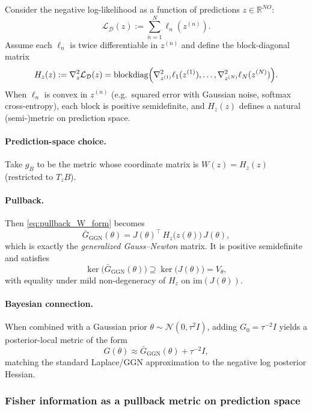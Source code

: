 Consider the negative log-likelihood as a function of predictions $z\in\mathbb R^{NO}$:
\[
\mathcal L_{\mathcal D}(z) := \sum_{n=1}^N \ell_n(z^{(n)}).
\]
Assume each $\ell_n$ is twice differentiable in $z^{(n)}$ and define the block-diagonal matrix
\[
H_z(z) := \nabla_z^2 \mathcal L_{\mathcal D}(z)
=
\mathrm{blockdiag}\Bigl(\nabla_{z^{(1)}}^2\ell_1(z^{(1)}),\dots,\nabla_{z^{(N)}}^2\ell_N(z^{(N)})\Bigr).
\]
When $\ell_n$ is convex in $z^{(n)}$ (e.g.\ squared error with Gaussian noise, softmax cross-entropy),
each block is positive semidefinite, and $H_z(z)$ defines a natural (semi-)metric on prediction space.

\paragraph{Prediction-space choice.}
Take $g_B$ to be the metric whose coordinate matrix is $W(z)=H_z(z)$ (restricted to $T_zB$).

\paragraph{Pullback.}
Then \eqref{eq:pullback_W_form} becomes
\begin{equation}
\bar G_{\mathrm{GGN}}(\theta)
=
J(\theta)^\top\,H_z\bigl(z(\theta)\bigr)\,J(\theta),
\label{eq:ggn_pullback}
\end{equation}
which is exactly the \emph{generalized Gauss--Newton} matrix.
It is positive semidefinite and satisfies
\[
\ker\bigl(\bar G_{\mathrm{GGN}}(\theta)\bigr)\supseteq \ker\bigl(J(\theta)\bigr)=V_\theta,
\]
with equality under mild non-degeneracy of $H_z$ on $\mathrm{im}(J(\theta))$.

\paragraph{Bayesian connection.}
When combined with a Gaussian prior $\theta\sim\mathcal N(0,\tau^2 I)$, adding $G_0=\tau^{-2}I$ yields a
posterior-local metric of the form
\[
G(\theta)\approx \bar G_{\mathrm{GGN}}(\theta)+\tau^{-2}I,
\]
matching the standard Laplace/GGN approximation to the negative log posterior Hessian.

\subsubsection{Fisher information as a pullback metric on prediction space}

